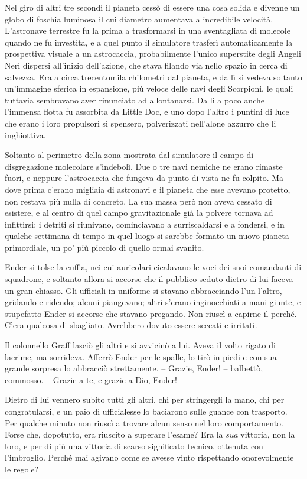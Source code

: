 {Nel giro di altri tre secondi il pianeta cessò di essere una cosa
	solida e divenne un globo di foschia luminosa il cui diametro aumentava
	a incredibile velocità. L'astronave terrestre fu la prima a trasformarsi
	in una sventagliata di molecole quando ne fu investita, e a quel punto
	il simulatore trasferì automaticamente la prospettiva visuale a un
	astrocaccia, probabilmente l'unico superstite degli Angeli Neri dispersi
	all'inizio dell'azione, che stava filando via nello spazio in cerca di
	salvezza. Era a circa trecentomila chilometri dal pianeta, e da lì si
	vedeva soltanto un'immagine sferica in espansione, più veloce delle navi
	degli Scorpioni, le quali tuttavia sembravano aver rinunciato ad
	allontanarsi. Da lì a poco anche l'immensa flotta fu assorbita da Little
	Doc, e uno dopo l'altro i puntini di luce che erano i loro propulsori si
	spensero, polverizzati nell'alone azzurro che li inghiottiva.}

{Soltanto al perimetro della zona mostrata dal simulatore il campo di
	disgregazione molecolare s'indebolì. Due o tre navi nemiche ne erano
	rimaste fuori, e neppure l'astrocaccia che fungeva da punto di vista ne
	fu colpito. Ma dove prima c'erano migliaia di astronavi e il pianeta che
	esse avevano protetto, non restava più nulla di concreto. La sua massa
	però non aveva cessato di esistere, e al centro di quel campo
	gravitazionale già la polvere tornava ad infittirsi: i detriti si
	riunivano, cominciavano a surriscaldarsi e a fondersi, e in qualche
	settimana di tempo in quel luogo si sarebbe formato un nuovo pianeta
	primordiale, un po' più piccolo di quello ormai svanito.}

{Ender si tolse la cuffia, nei cui auricolari cicalavano le voci dei
	suoi comandanti di squadrone, e soltanto allora si accorse che il
	pubblico seduto dietro di lui faceva un gran chiasso. Gli ufficiali in
	uniforme si stavano abbracciando l'un l'altro, gridando e ridendo;
	alcuni piangevano; altri s'erano inginocchiati a mani giunte, e
	stupefatto Ender si accorse che stavano pregando. Non riuscì a capirne
	il perché. C'era qualcosa di sbagliato. Avrebbero dovuto essere seccati
	e irritati.}

{Il colonnello Graff lasciò gli altri e si avvicinò a lui. Aveva il
	volto rigato di lacrime, ma sorrideva. Afferrò Ender per le spalle, lo
	tirò in piedi e con sua grande sorpresa lo abbracciò strettamente. --
	Grazie, Ender! -- balbettò, commosso. -- Grazie a te, e grazie a Dio,
	Ender!}

{Dietro di lui vennero subito tutti gli altri, chi per stringergli la
	mano, chi per congratularsi, e un paio di ufficialesse lo baciarono
	sulle guance con trasporto. Per qualche minuto non riuscì a trovare
	alcun senso nel loro comportamento. Forse che, dopotutto, era riuscito a
	superare l'esame? Era la \emph{sua} vittoria, non la loro, e per di più
	una vittoria di scarso significato tecnico, ottenuta con l'imbroglio.
	Perché mai agivano come se avesse vinto rispettando onorevolmente le
	regole?}

